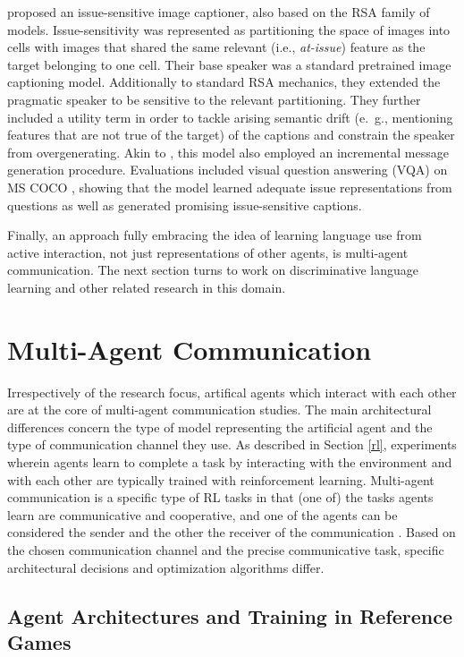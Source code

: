 \cite{nie2020pragmatic} proposed an issue-sensitive image captioner, also based on the RSA family of models. Issue-sensitivity was represented as partitioning the space of images into cells with images that shared the same relevant (i.e., \textit{at-issue}) feature as the target belonging to one cell. Their base speaker was a standard  pretrained image captioning model. Additionally to standard RSA mechanics, they extended the pragmatic speaker to be sensitive to the relevant partitioning. They further included a utility term in order to tackle arising semantic drift (e.~g., mentioning features that are not true of the target) of the captions and constrain the speaker from overgenerating. Akin to \cite{cohn2018pragmatically}, this model also employed an incremental message generation procedure. Evaluations included visual question answering (VQA) on MS COCO \parencite{chen2015microsoft}, showing that the model learned adequate issue representations from questions as well as generated promising issue-sensitive captions. 

Finally, an approach fully embracing the idea of learning language use from active interaction, not just representations of other agents,  is multi-agent communication. The next section turns to work on discriminative language learning and other related research in this domain.

\section{Multi-Agent Communication}
\label{mac}
Irrespectively of the research focus, artifical agents which interact with each other are at the core of multi-agent communication studies.
The main architectural differences concern the type of model representing the artificial agent and the type of communication channel they use.
As described in Section \ref{rl}, experiments wherein agents learn to complete a task by interacting with the environment and with each other are typically trained with reinforcement learning. Multi-agent communication is a specific type of RL tasks in that (one of) the tasks agents learn are communicative and cooperative, and one of the agents can be considered the sender and the other the receiver of the communication \parencite[cf.][]{tan1993multi, lazaridou2016multi}.
Based on the chosen communication channel and the precise communicative task, specific architectural decisions and optimization algorithms differ. 

\subsection{Agent Architectures and Training in Reference Games}
\label{multi_agent_arch}

